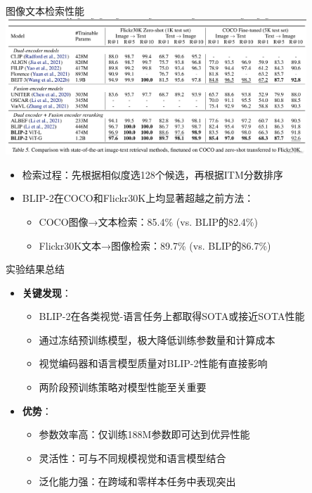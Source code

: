 \documentclass{beamer}
\begin{document}
  \begin{frame}{图像文本检索性能}
    \centering
    \includegraphics[width=0.85\textwidth]{table7.png}
    \vspace{0.2cm}
    
    \begin{itemize}
      \item 检索过程：先根据相似度选128个候选，再根据ITM分数排序
      \item BLIP-2在COCO和Flickr30K上均显著超越之前方法：
        \begin{itemize}
          \item COCO图像→文本检索：85.4\% (vs. BLIP的82.4\%)
          \item Flickr30K文本→图像检索：89.7\% (vs. BLIP的86.7\%)
        \end{itemize}
    \end{itemize}
  \end{frame}
  
  \begin{frame}{实验结果总结}
    \begin{itemize}
      \item \textbf{关键发现}：
        \begin{itemize}
          \item BLIP-2在各类视觉-语言任务上都取得SOTA或接近SOTA性能
          \item 通过冻结预训练模型，极大降低训练参数量和计算成本
          \item 视觉编码器和语言模型质量对BLIP-2性能有直接影响
          \item 两阶段预训练策略对模型性能至关重要
        \end{itemize}
      \item \textbf{优势}：
        \begin{itemize}
          \item 参数效率高：仅训练188M参数即可达到优异性能
          \item 灵活性：可与不同规模视觉和语言模型结合
          \item 泛化能力强：在跨域和零样本任务中表现突出
        \end{itemize}
    \end{itemize}
  \end{frame}
\end{document}

